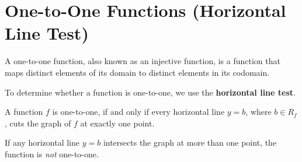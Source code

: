 \documentclass[11pt,a4paper]{book}
\begin{document}
\newpage

\section{One-to-One Functions (Horizontal Line Test)}

A one-to-one function, also known as an injective function, is a function that maps distinct elements of its domain to distinct elements in its codomain.

To determine whether a function is one-to-one, we use the \textbf{horizontal line test}.

\medskip{}

\begin{tcolorbox}[colback=blue!5, colframe=black,boxrule=.4pt, sharpish corners]

A function $f$ is one-to-one, if and only if every horizontal line $y=b$,
where $b\in R_{f}$, cuts the graph of $f$ at exactly one point.

\end{tcolorbox}

 If any horizontal line $y=b$ intersects the graph at more than one point, the function is \textit{not} one-to-one.
\end{document}
